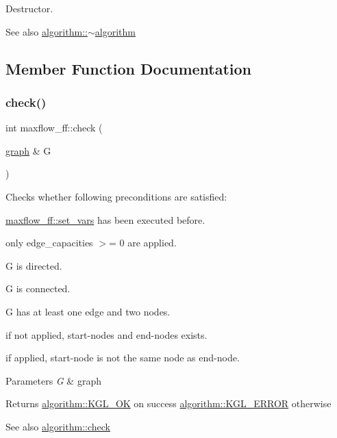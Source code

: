 Destructor.

\begin{DoxySeeAlso}{See also}
\mbox{\hyperlink{classalgorithm_adca9b1e7fa3afd914519a9dbb44e9fd5}{algorithm\+::$\sim$algorithm}} 
\end{DoxySeeAlso}


\subsection{Member Function Documentation}
\mbox{\label{classmaxflow__ff_a4d0deee7d70bac4c9dad942341d87e37}} 
\subsubsection{\texorpdfstring{check()}{check()}}
{\footnotesize\ttfamily int maxflow\+\_\+ff\+::check (\begin{DoxyParamCaption}\item[{\mbox{\hyperlink{classgraph}{graph}} \&}]{G }\end{DoxyParamCaption})\hspace{0.3cm}{\ttfamily [virtual]}}

Checks whether following preconditions are satisfied\+: 
\begin{DoxyItemize}
\item \mbox{\hyperlink{classmaxflow__ff_ad2485a4c093dbcfa045d1e6e5d78f533}{maxflow\+\_\+ff\+::set\+\_\+vars}} has been executed before. 
\item only edge\+\_\+capacities $>$= 0 are applied. 
\item {\ttfamily G} is directed. 
\item {\ttfamily G} is connected. 
\item {\ttfamily G} has at least one edge and two nodes. 
\item if not applied, start-\/nodes and end-\/nodes exists. 
\item if applied, start-\/node is not the same node as end-\/node. 
\end{DoxyItemize}


\begin{DoxyParams}{Parameters}
{\em G} & graph \\
\hline
\end{DoxyParams}
\begin{DoxyReturn}{Returns}
{\ttfamily \mbox{\hyperlink{classalgorithm_af1a0078e153aa99c24f9bdf0d97f6710aae4c1cd7fe8d8cf4b143241a6e7c31cf}{algorithm\+::\+K\+G\+L\+\_\+\+OK}}} on success {\ttfamily \mbox{\hyperlink{classalgorithm_af1a0078e153aa99c24f9bdf0d97f6710ae67bf27b2ef31f73e545a7f9f4a69556}{algorithm\+::\+K\+G\+L\+\_\+\+E\+R\+R\+OR}}} otherwise 
\end{DoxyReturn}
\begin{DoxySeeAlso}{See also}
\mbox{\hyperlink{classalgorithm_a76361fb03ad1cf643affc51821e43bed}{algorithm\+::check}} 
\end{DoxySeeAlso}


